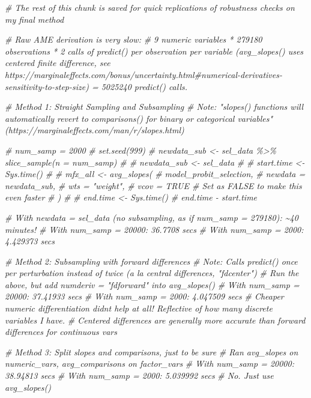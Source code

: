 \documentclass[
]{article}
\newenvironment{Shaded}{\begin{snugshade}}{\end{snugshade}}
\newcommand{\CommentTok}[1]{\textcolor[rgb]{0.56,0.35,0.01}{\textit{#1}}}
\begin{document}
\begin{Shaded}
\begin{Highlighting}[]
\CommentTok{\# The rest of this chunk is saved for quick replications of robustness checks on my final method}

\CommentTok{\# Raw AME derivation is very slow: }
\CommentTok{\# 9 numeric variables * 279180 observations * 2 calls of predict() per observation per variable (avg\_slopes() uses centered finite difference, see https://marginaleffects.com/bonus/uncertainty.html\#numerical{-}derivatives{-}sensitivity{-}to{-}step{-}size) = 5025240 predict() calls. }

\CommentTok{\# Method 1: Straight Sampling and Subsampling }
\CommentTok{\# Note: "slopes() functions will automatically revert to comparisons() for binary or categorical variables" (https://marginaleffects.com/man/r/slopes.html)}

\CommentTok{\# num\_samp = 2000}
\CommentTok{\# set.seed(999)}
\CommentTok{\# newdata\_sub \textless{}{-} sel\_data \%\textgreater{}\% slice\_sample(n = num\_samp)}
\CommentTok{\# \# newdata\_sub \textless{}{-} sel\_data}
\CommentTok{\# }
\CommentTok{\# start.time \textless{}{-} Sys.time()}
\CommentTok{\# }
\CommentTok{\# mfx\_all \textless{}{-} avg\_slopes(}
\CommentTok{\#   model\_probit\_selection,}
\CommentTok{\#   newdata = newdata\_sub,}
\CommentTok{\#   wts = "weight",}
\CommentTok{\#   vcov = TRUE \# Set as FALSE to make this even faster}
\CommentTok{\# )}
\CommentTok{\# }
\CommentTok{\# end.time \textless{}{-} Sys.time()}
\CommentTok{\# end.time {-} start.time}

\CommentTok{\# With newdata = sel\_data (no subsampling, as if num\_samp = 279180): \textasciitilde{}40 minutes!}
\CommentTok{\# With num\_samp = 20000: 36.7708 secs}
\CommentTok{\# With num\_samp = 2000: 4.429373 secs}

\CommentTok{\# Method 2: Subsampling with forward differences}
\CommentTok{\# Note: Calls predict() once per perturbation instead of twice (a la central differences, "fdcenter")}
\CommentTok{\# Run the above, but add numderiv = "fdforward" into avg\_slopes()}
\CommentTok{\# With num\_samp = 20000: 37.41933 secs}
\CommentTok{\# With num\_samp = 2000: 4.047509 secs}
\CommentTok{\# Cheaper numeric differentiation didn\textquotesingle{}t help at all! Reflective of how many discrete variables I have.}
\CommentTok{\# Centered differences are generally more accurate than forward differences for continuous vars}

\CommentTok{\# Method 3: Split slopes and comparisons, just to be sure}
\CommentTok{\# Ran avg\_slopes on numeric\_vars, avg\_comparisons on factor\_vars}
\CommentTok{\# With num\_samp = 20000: 38.94813 secs}
\CommentTok{\# With num\_samp = 2000: 5.039992 secs}
\CommentTok{\# No. Just use avg\_slopes()}



\end{Highlighting}
\end{Shaded}
\end{document}
